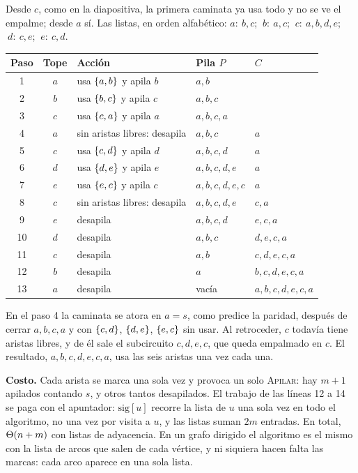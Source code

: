 \documentclass[11pt,letterpaper]{article}
\begin{document}
\begin{ejemplo}
  \label{ej:hierholzer-traza}
  Desde $c$, como en la diapositiva, la primera caminata ya usa todo y
  no se ve el empalme; desde $a$ sí. Las listas, en orden alfabético:
  $a{:}\ b, c$; $\ b{:}\ a, c$; $\ c{:}\ a, b, d, e$; $\ d{:}\ c, e$;
  $\ e{:}\ c, d$.
  \begin{center}
  \small
  \begin{tabular}{cclll}
    \toprule
    \textbf{Paso} & \textbf{Tope} & \textbf{Acción} & \textbf{Pila $P$}
      & \textbf{$C$} \\
    \midrule
    1 & $a$ & usa $\left\{ a,b \right\}$ y apila $b$ & $a, b$ & \\
    2 & $b$ & usa $\left\{ b,c \right\}$ y apila $c$ & $a, b, c$ & \\
    3 & $c$ & usa $\left\{ c,a \right\}$ y apila $a$ & $a, b, c, a$ & \\
    4 & $a$ & sin aristas libres: desapila & $a, b, c$ & $a$ \\
    5 & $c$ & usa $\left\{ c,d \right\}$ y apila $d$ & $a, b, c, d$ & $a$ \\
    6 & $d$ & usa $\left\{ d,e \right\}$ y apila $e$ & $a, b, c, d, e$ & $a$ \\
    7 & $e$ & usa $\left\{ e,c \right\}$ y apila $c$ & $a, b, c, d, e, c$ & $a$ \\
    8 & $c$ & sin aristas libres: desapila & $a, b, c, d, e$ & $c, a$ \\
    9 & $e$ & desapila & $a, b, c, d$ & $e, c, a$ \\
    10 & $d$ & desapila & $a, b, c$ & $d, e, c, a$ \\
    11 & $c$ & desapila & $a, b$ & $c, d, e, c, a$ \\
    12 & $b$ & desapila & $a$ & $b, c, d, e, c, a$ \\
    13 & $a$ & desapila & vacía & $a, b, c, d, e, c, a$ \\
    \bottomrule
  \end{tabular}
  \end{center}
  En el paso 4 la caminata se atora en $a = s$, como predice la
  paridad, después de cerrar $a, b, c, a$ y con $\left\{ c,d \right\}$,
  $\left\{ d,e \right\}$, $\left\{ e,c \right\}$ sin usar. Al retroceder, $c$ todavía tiene
  aristas libres, y de él sale el subcircuito $c, d, e, c$, que queda
  empalmado en $c$. El resultado, $a, b, c, d, e, c, a$, usa las seis
  aristas una vez cada una.
\end{ejemplo}

\textbf{Costo.} Cada arista se marca una sola vez y provoca un solo
\textsc{Apilar}: hay $m + 1$ apilados contando $s$, y otros tantos
desapilados. El trabajo de las líneas 12 a 14 se paga con el
apuntador: $\text{sig}[u]$ recorre la lista de $u$ una sola vez en
todo el algoritmo, no una vez por visita a $u$, y las listas suman
$2m$ entradas. En total, $\Theta\!\left(n + m\right)$ con listas de adyacencia. En un
grafo dirigido el algoritmo es el mismo con la lista de arcos que
salen de cada vértice, y ni siquiera hacen falta las marcas: cada arco
aparece en una sola lista.
\end{document}

